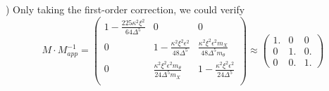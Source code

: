 \right) \label{Yilin.43} \eeq
Only taking the first-order correction, we could verify
$$ M \cdot M^{-1}_{app} = \left( \begin{array}{ccc} 1-\frac{225 \kappa ^2 \xi ^2}{64 \Delta ^5} & 0 & 0 \\ 0 & 1-\frac{\kappa ^2 \xi ^2 \epsilon ^2}{48 \Delta ^5} & \frac{\kappa ^2 \xi ^2 \epsilon ^2 m_X}{48 \Delta ^5 m_{\theta }} \\ 0 & \frac{\kappa ^2 \xi ^2 \epsilon ^2 m_{\theta }}{24 \Delta ^5 m_X} & 1-\frac{\kappa ^2 \xi ^2 \epsilon ^2}{24 \Delta ^5} \\ \end{array} \right) \approx \left(\begin{array}{ccc}1. & 0 & 0 \\0 & 1. & 0. \\0 & 0. & 1.\end{array}\right)$$





